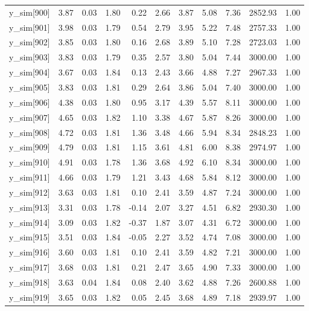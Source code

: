 \begin{table}[ht]
\begin{tabular}{rrrrrrrrrrr}
  y\_sim[900] & 3.87 & 0.03 & 1.80 & 0.22 & 2.66 & 3.87 & 5.08 & 7.36 & 2852.93 & 1.00 \\ 
  y\_sim[901] & 3.98 & 0.03 & 1.79 & 0.54 & 2.79 & 3.95 & 5.22 & 7.48 & 2757.33 & 1.00 \\ 
  y\_sim[902] & 3.85 & 0.03 & 1.80 & 0.16 & 2.68 & 3.89 & 5.10 & 7.28 & 2723.03 & 1.00 \\ 
  y\_sim[903] & 3.83 & 0.03 & 1.79 & 0.35 & 2.57 & 3.80 & 5.04 & 7.44 & 3000.00 & 1.00 \\ 
  y\_sim[904] & 3.67 & 0.03 & 1.84 & 0.13 & 2.43 & 3.66 & 4.88 & 7.27 & 2967.33 & 1.00 \\ 
  y\_sim[905] & 3.83 & 0.03 & 1.81 & 0.29 & 2.64 & 3.86 & 5.04 & 7.40 & 3000.00 & 1.00 \\ 
  y\_sim[906] & 4.38 & 0.03 & 1.80 & 0.95 & 3.17 & 4.39 & 5.57 & 8.11 & 3000.00 & 1.00 \\ 
  y\_sim[907] & 4.65 & 0.03 & 1.82 & 1.10 & 3.38 & 4.67 & 5.87 & 8.26 & 3000.00 & 1.00 \\ 
  y\_sim[908] & 4.72 & 0.03 & 1.81 & 1.36 & 3.48 & 4.66 & 5.94 & 8.34 & 2848.23 & 1.00 \\ 
  y\_sim[909] & 4.79 & 0.03 & 1.81 & 1.15 & 3.61 & 4.81 & 6.00 & 8.38 & 2974.97 & 1.00 \\ 
  y\_sim[910] & 4.91 & 0.03 & 1.78 & 1.36 & 3.68 & 4.92 & 6.10 & 8.34 & 3000.00 & 1.00 \\ 
  y\_sim[911] & 4.66 & 0.03 & 1.79 & 1.21 & 3.43 & 4.68 & 5.84 & 8.12 & 3000.00 & 1.00 \\ 
  y\_sim[912] & 3.63 & 0.03 & 1.81 & 0.10 & 2.41 & 3.59 & 4.87 & 7.24 & 3000.00 & 1.00 \\ 
  y\_sim[913] & 3.31 & 0.03 & 1.78 & -0.14 & 2.07 & 3.27 & 4.51 & 6.82 & 2930.30 & 1.00 \\ 
  y\_sim[914] & 3.09 & 0.03 & 1.82 & -0.37 & 1.87 & 3.07 & 4.31 & 6.72 & 3000.00 & 1.00 \\ 
  y\_sim[915] & 3.51 & 0.03 & 1.84 & -0.05 & 2.27 & 3.52 & 4.74 & 7.08 & 3000.00 & 1.00 \\ 
  y\_sim[916] & 3.60 & 0.03 & 1.81 & 0.10 & 2.41 & 3.59 & 4.82 & 7.21 & 3000.00 & 1.00 \\ 
  y\_sim[917] & 3.68 & 0.03 & 1.81 & 0.21 & 2.47 & 3.65 & 4.90 & 7.33 & 3000.00 & 1.00 \\ 
  y\_sim[918] & 3.63 & 0.04 & 1.84 & 0.08 & 2.40 & 3.62 & 4.88 & 7.26 & 2600.88 & 1.00 \\ 
  y\_sim[919] & 3.65 & 0.03 & 1.82 & 0.05 & 2.45 & 3.68 & 4.89 & 7.18 & 2939.97 & 1.00 \\ 

\end{tabular}
\end{table}
